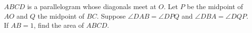 $ABCD$ is a parallelogram whose diagonals meet at $O$. Let $P$ be the midpoint of $AO$ and $Q$ the midpoint of $BC$. Suppose $\angle DAB=\angle DPQ$ and $\angle DBA=\angle DQP$. If $AB=1$, find the area of $ABCD$.
